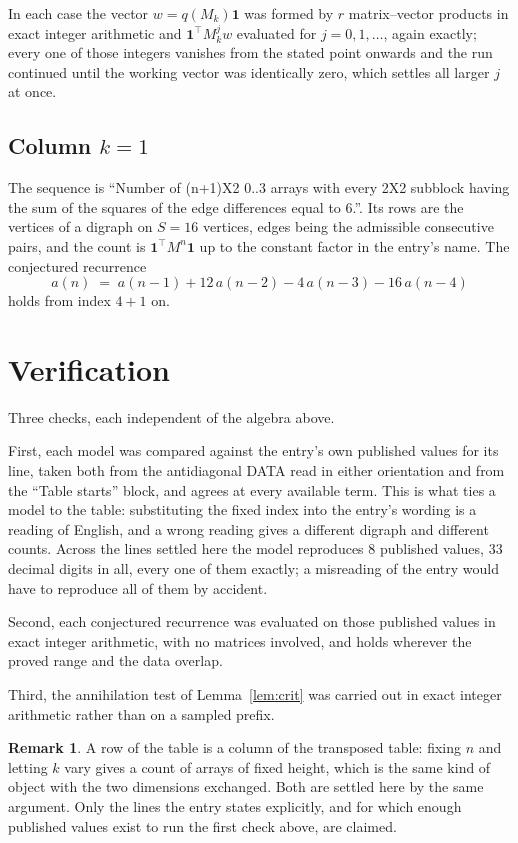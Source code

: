 \documentclass[11pt,a4paper]{article}
\theoremstyle{plain}
\theoremstyle{definition}
\newtheorem{remark}[theorem]{Remark}
\begin{document}
In each case the vector $w=q(M_k)\mathbf{1}$ was formed by $r$ matrix--vector products in
exact integer arithmetic and $\mathbf{1}^{\!\top}M_k^{j}w$ evaluated for $j=0,1,\dots$,
again exactly; every one of those integers vanishes from the stated point onwards and the run
continued until the working vector was identically zero, which settles all larger $j$ at once.

\subsection*{Column $k$$=1$}
The sequence is ``Number of (n+1)X2 0..3 arrays with every 2X2 subblock having the sum of the squares of the edge differences equal to 6.''. Its rows are the vertices of a digraph on
$S=16$ vertices, edges being the admissible consecutive pairs, and the count is
$\mathbf{1}^{\!\top}M^{n}\mathbf{1}$ up to the constant factor in the entry's name.
The conjectured recurrence
\[
a(n)\;=\;a(n-1) + 12\,a(n-2) - 4\,a(n-3) - 16\,a(n-4)
\]
holds from index $4+1$ on.

\section{Verification}

Three checks, each independent of the algebra above.

First, each model was compared against the entry's own published values for its line, taken
both from the antidiagonal DATA read in either orientation and from the ``Table starts''
block, and agrees at every available term. This is what ties a model to the table:
substituting the fixed index into the entry's wording is a reading of English, and a wrong
reading gives a different digraph and different counts. Across the lines settled here the
model reproduces $8$ published values, $33$ decimal digits in all, every one of
them exactly; a misreading of the entry would have to reproduce all of them by accident.

Second, each conjectured recurrence was evaluated on those published values in exact
integer arithmetic, with no matrices involved, and holds wherever the proved range and the
data overlap.

Third, the annihilation test of Lemma~\ref{lem:crit} was carried out in exact integer
arithmetic rather than on a sampled prefix.

\begin{remark}
A row of the table is a column of the transposed table: fixing $n$ and letting $k$ vary gives a
count of arrays of fixed height, which is the same kind of object with the two dimensions
exchanged. Both are settled here by the same argument. Only the lines the entry states
explicitly, and for which enough published values exist to run the first check above, are
claimed.
\end{remark}
\end{document}

